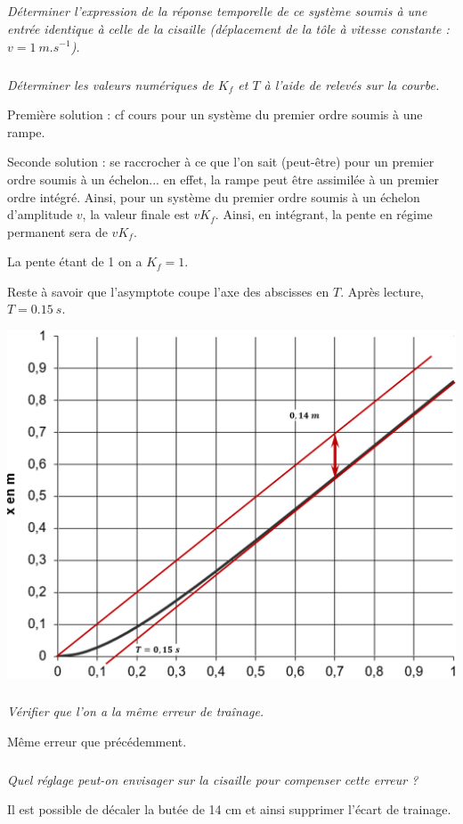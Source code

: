 \documentclass[10pt,fleqn]{article} %
\begin{document}
\begin{multicols}{2}
\subparagraph{}\textit{Déterminer l'expression de la réponse temporelle de ce système soumis à une entrée identique à celle de la cisaille (déplacement de la tôle à vitesse constante : $v = \SI{1}{m.s^{-1}}$).}
\subparagraph{}\textit{Déterminer les valeurs numériques de $K_f$ et $T$ à l'aide de relevés sur la courbe.}
\ifprof \begin{corrige}

Première solution : cf cours pour un système du premier ordre soumis à une rampe. 

Seconde solution : se raccrocher à ce que l'on sait (peut-être) pour un premier ordre soumis à un échelon... en effet, la rampe peut être assimilée à un premier ordre intégré. Ainsi, pour un système du premier ordre soumis à un échelon d'amplitude $v$, la valeur finale est $vK_f$. Ainsi, en intégrant, la pente en régime permanent sera de $vK_f$. 

La pente étant de 1 on a $K_f=1$. 

Reste à savoir que l'asymptote coupe l'axe des abscisses en $T$. Après lecture, $T=\SI{0,15}{s}$.
\end{corrige} 
\begin{center}
\includegraphics[width=\linewidth]{images/cor_04}
\end{center}
\else \fi





\subparagraph{}\textit{Vérifier que l'on a la même erreur de traînage.}
\ifprof \begin{corrige}
Même erreur que précédemment.
\end{corrige} \else \fi

\subparagraph{}\textit{Quel réglage peut-on envisager sur la cisaille pour compenser cette erreur ?}

\ifprof \begin{corrige}
Il est possible de décaler la butée de 14 cm et ainsi supprimer l'écart de trainage.
\end{corrige} \else \fi


\end{multicols}
\end{document}
